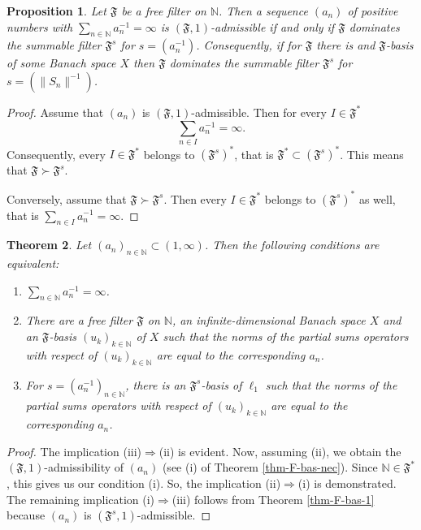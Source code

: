 \documentclass[11pt,twoside, reqno]{amsart}
\newcommand{\N}{{\mathbb N}}
\newcommand{\F}{\mathfrak{F}}
\theoremstyle{plain}
\newtheorem{theorem}{Theorem}[section]
\newtheorem{proposition}[theorem]{Proposition}
\theoremstyle{remark}
\theoremstyle{definition}
\numberwithin{equation}{section}
\begin{document}
\begin{proposition} \label{prop-sum-fil++}
Let $\F$ be a free filter on $\N$. Then a sequence  $(a_n)$ of positive numbers with $\sum_{n \in \N} a_n^{-1} = \infty$  is $(\F, 1)$-admissible if and only if $\F$ dominates the summable filter $\F^{s}$ for  $s=\left(a_n^{-1}\right)$. Consequently, if for $\F$ there is and $\F$-basis of some Banach space $X$ then $\F$ dominates the summable filter $\F^{s}$ for $s=\left(\|S_n\|^{-1}\right)$.
\end{proposition}
\begin{proof}
Assume that  $(a_n)$ is $(\F, 1)$-admissible. Then for every $I \in \mathfrak{F}^*$
$$
 \sum\limits_{n \in I} a_n^{-1} = \infty.
$$
Consequently, every $I \in \mathfrak{F}^*$ belongs to $\left(\F^{s}\right)^*$, that is $\mathfrak{F}^* \subset \left(\F^{s}\right)^*$. This means that  $\F \succ \F^{s}$.

Conversely, assume that  $\F \succ \F^{s}$. Then every $I \in \mathfrak{F}^*$ belongs to $\left(\F^{s}\right)^*$ as well, that is $\sum\limits_{n \in I} a_n^{-1} = \infty$.
\end{proof}


\begin{theorem}  \label{thm-sum-fil1}
Let $(a_n)_{n \in \N} \subset (1, \infty)$.  Then the following conditions are equivalent:
\begin{enumerate}
\item[(i)] $\sum_{n \in \N} a_n^{-1} = \infty$.

\item[(ii)] There are a free filter $\F$ on $\N$, an infinite-dimensional Banach space $X$ and an $\F$-basis  $(u_k)_{k \in \N}$ of $X$ such that the norms of the partial sums operators with respect of $(u_k)_{k \in \N}$ are equal to the corresponding $a_n$.

\item[(iii)] For $s = \left(a_n^{-1}\right)_{n \in \N}$, there is an $\F^s$-basis of $\ell_1$ such that the norms of the partial sums operators with respect of $(u_k)_{k \in \N}$ are equal to the corresponding $a_n$.
\end{enumerate}
\end{theorem}
\begin{proof}
The implication (iii)$\Longrightarrow$(ii) is evident. Now, assuming (ii), we obtain the $(\F, 1)$-admissibility of  $(a_n)$ (see (i) of Theorem \ref{thm-F-bas-nec}). Since $\N \in \F^*$, this gives us our condition (i).   So, the implication  (ii)$\Longrightarrow$(i) is demonstrated. The remaining implication (i)$\Longrightarrow$(iii) follows from Theorem \ref{thm-F-bas-1} because $(a_n)$ is $(\F^s, 1)$-admissible.
\end{proof}
\end{document}
